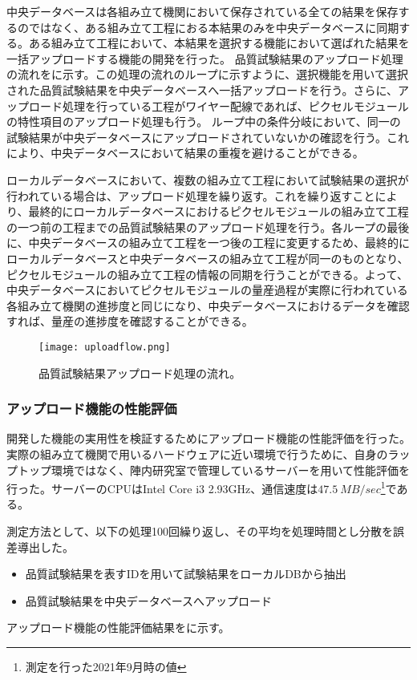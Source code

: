 中央データベースは各組み立て機関において保存されている全ての結果を保存するのではなく、ある組み立て工程におる本結果のみを中央データベースに同期する。ある組み立て工程において、本結果を選択する機能において選ばれた結果を一括アップロードする機能の開発を行った。
品質試験結果のアップロード処理の流れをに示す。この処理の流れのループに示すように、選択機能を用いて選択された品質試験結果を中央データベースへ一括アップロードを行う。さらに、アップロード処理を行っている工程がワイヤー配線であれば、ピクセルモジュールの特性項目のアップロード処理も行う。
ループ中の条件分岐において、同一の試験結果が中央データベースにアップロードされていないかの確認を行う。これにより、中央データベースにおいて結果の重複を避けることができる。

ローカルデータベースにおいて、複数の組み立て工程において試験結果の選択が行われている場合は、アップロード処理を繰り返す。これを繰り返すことにより、最終的にローカルデータベースにおけるピクセルモジュールの組み立て工程の一つ前の工程までの品質試験結果のアップロード処理を行う。各ループの最後に、中央データベースの組み立て工程を一つ後の工程に変更するため、最終的にローカルデータベースと中央データベースの組み立て工程が同一のものとなり、ピクセルモジュールの組み立て工程の情報の同期を行うことができる。よって、中央データベースにおいてピクセルモジュールの量産過程が実際に行われている各組み立て機関の進捗度と同じになり、中央データベースにおけるデータを確認すれば、量産の進捗度を確認することができる。

\begin{figure}[tbp]
  \centering
  \texttt{[image: uploadflow.png]}
  \caption[品質試験結果アップロード処理の流れ]{品質試験結果アップロード処理の流れ。}
  \label{fig:uploadresults}
\end{figure}


\subsubsection{アップロード機能の性能評価}

開発した機能の実用性を検証するためにアップロード機能の性能評価を行った。実際の組み立て機関で用いるハードウェアに近い環境で行うために、自身のラップトップ環境ではなく、陣内研究室で管理しているサーバーを用いて性能評価を行った。サーバーのCPUはIntel Core i3 2.93GHz、通信速度は$47.5\ \si{MB/sec}$\footnote{測定を行った2021年9月時の値}である。

測定方法として、以下の処理100回繰り返し、その平均を処理時間とし分散を誤差導出した。
\begin{itemize}
  \item[1. ] 品質試験結果を表すIDを用いて試験結果をローカルDBから抽出
  \item[2. ] 品質試験結果を中央データベースへアップロード
\end{itemize}
アップロード機能の性能評価結果をに示す。

